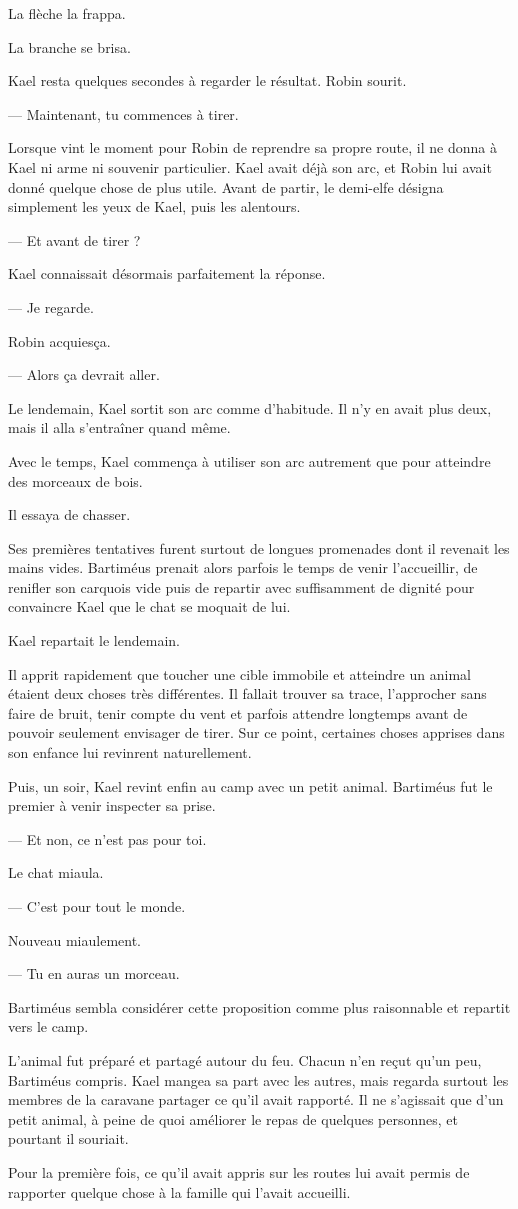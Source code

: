 La flèche la frappa.

La branche se brisa.

Kael resta quelques secondes à regarder le résultat. Robin sourit.

— Maintenant, tu commences à tirer.

\scenebreak

Lorsque vint le moment pour Robin de reprendre sa propre route, il ne donna à
Kael ni arme ni souvenir particulier. Kael avait déjà son arc, et Robin lui
avait donné quelque chose de plus utile. Avant de partir, le demi-elfe désigna
simplement les yeux de Kael, puis les alentours.

— Et avant de tirer ?

Kael connaissait désormais parfaitement la réponse.

— Je regarde.

Robin acquiesça.

— Alors ça devrait aller.

Le lendemain, Kael sortit son arc comme d'habitude. Il n'y en avait plus deux,
mais il alla s'entraîner quand même.

\scenebreak

Avec le temps, Kael commença à utiliser son arc autrement que pour atteindre
des morceaux de bois.

Il essaya de chasser.

Ses premières tentatives furent surtout de longues promenades dont il revenait
les mains vides. Bartiméus prenait alors parfois le temps de venir l'accueillir,
de renifler son carquois vide puis de repartir avec suffisamment de dignité
pour convaincre Kael que le chat se moquait de lui.

Kael repartait le lendemain.

Il apprit rapidement que toucher une cible immobile et atteindre un animal
étaient deux choses très différentes. Il fallait trouver sa trace, l'approcher
sans faire de bruit, tenir compte du vent et parfois attendre longtemps avant
de pouvoir seulement envisager de tirer. Sur ce point, certaines choses
apprises dans son enfance lui revinrent naturellement.

Puis, un soir, Kael revint enfin au camp avec un petit animal. Bartiméus fut le
premier à venir inspecter sa prise.

— Et non, ce n'est pas pour toi.

Le chat miaula.

— C'est pour tout le monde.

Nouveau miaulement.

— Tu en auras un morceau.

Bartiméus sembla considérer cette proposition comme plus raisonnable et
repartit vers le camp.

L'animal fut préparé et partagé autour du feu. Chacun n'en reçut qu'un peu,
Bartiméus compris. Kael mangea sa part avec les autres, mais regarda surtout
les membres de la caravane partager ce qu'il avait rapporté. Il ne s'agissait
que d'un petit animal, à peine de quoi améliorer le repas de quelques
personnes, et pourtant il souriait.

Pour la première fois, ce qu'il avait appris sur les routes lui avait permis
de rapporter quelque chose à la famille qui l'avait accueilli.